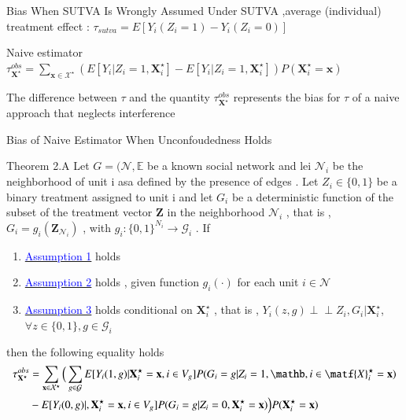 \documentclass[notes,11pt, aspectratio=169]{beamer}
\begin{document}
\begin{frame}{Bias When SUTVA Is Wrongly Assumed}
Under SUTVA ,average (individual) treatment effect : $\tau_{sutva}=E[Y_i(Z_i=1)-Y_i(Z_i=0)]$
\vspace{1em}
\begin{block}{Naive estimator}
\centering
$\tau_{\mathbf{X}^\star}^{obs}=\sum_{\mathbf{x} \in \mathcal{X}^\star}(E[Y_i|Z_i=1,\mathbf{X}_{i}^\star]-E[Y_i|Z_i=1,\mathbf{X}_{i}^\star])P(\mathbf{X}_{i}^\star=\mathbf{x})$
\end{block}
%
\vspace{1em}
The difference between $\tau$  and the quantity $\tau_{\mathbf{X}^\star}^{obs}$ represents the bias for $\tau$ of a naive approach that neglects interference
\end{frame}

\begin{frame}{Bias of Naive Estimator When Unconfoudedness Holds}
\begin{block}{Theorem 2.A} \label{theorem 2.A}
Let $G=(\mathcal{N},\mathbb{E}$ be a known social network and lei $\mathcal{N}_i$ be the neighborhood of unit i asa defined by the presence of edges . Let $Z_i \in \{0,1\}$ be a binary treatment assigned to unit i and let $G_i$ be a deterministic function of the subset of the treatment vector $\mathbf{Z}$ in the neighborhood $\mathcal{N}_i$ , that is , $ G_i = g_i(\mathbf{Z}_{\mathcal{N}_i})$ , with $g_i : \{0,1\}^{N_i} \rightarrow \mathcal{G}_i$ . If
\begin{enumerate}
    \item \hyperlink{assump1}{\textcolor{blue}{Assumption 1}} holds
    \item \hyperlink{assump2}{\textcolor{blue}{Assumption 2}} holds , given function $g_i(\cdot)$ for each unit $i \in \mathcal{N}$
    \item \hyperlink{assump3}{\textcolor{blue}{Assumption 3}} holds conditional on $\mathbf{X}_{i}^\star$ , that is , $Y_i(z,g) \perp\!\!\!\perp Z_i,G_i|\mathbf{X}_{i}^\star$, $\forall z \in \{0,1\} , g \in \mathcal{G}_i$
\end{enumerate}
then the following equality holds
\begin{align*}
\tau_{\mathbf{X}^\star}^{obs}&=\sum_{\mathbf{x} \in \mathcal{X}^\star} \Big( \sum_{g \in \mathcal{G}}E[Y_i(1,g)|\mathbf{X}_{i}^\star = \mathbf{x}, i \in V_g]P(G_i=g | Z_i=1 , \mathb , i \in \matf{X}_{i}^\star=\mathbf{x}) 
\\  &  -E[Y_i(0,g)|,\mathbf{X}_{i}^\star =\mathbf{x} , i \in V_g]P(G_i=g | Z_i=0,\mathbf{X}_{i}^\star=\mathbf{x})  \Big)  P(\mathbf{X}_{i}^\star=\mathbf{x}) %
\end{align*}
\end{block}
\end{frame}
\end{document}

